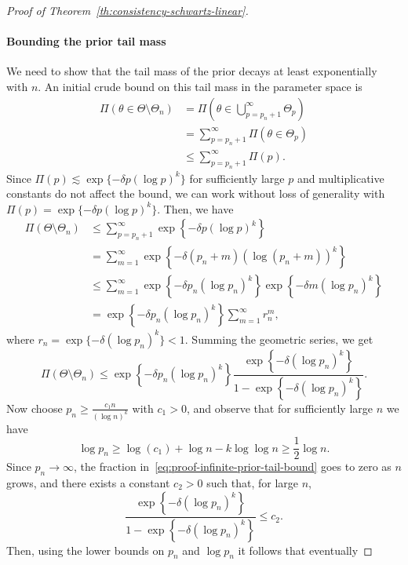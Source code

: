\begin{proof}[Proof of Theorem~\ref{th:consistency-schwartz-linear}]
\paragraph{Bounding the prior tail mass} We need to show that the tail mass of the prior decays at least exponentially with \(n\). An initial crude bound on this tail mass in the parameter space is
\begin{align*}
  \Pi(\theta \in \Theta \setminus \Theta_n) &= \Pi\left(\theta \in \bigcup_{p=p_n + 1}^\infty \Theta_p\right)\\
  &= \sum_{p=p_n+1}^\infty \Pi(\theta \in \Theta_p)\\
  &\leq \sum_{p=p_n+1}^{\infty} \Pi(p).
\end{align*}
Since \(\Pi(p)\lesssim \exp\{-\delta p(\log p)^k\}\) for sufficiently large \(p\) and multiplicative constants do not affect the bound, we can work without loss of generality with \(\Pi(p)=\exp\{-\delta p(\log p)^k\}\). Then, we have
\begin{align*}
  \Pi(\Theta \setminus \Theta_n) & \leq \sum_{p=p_n+1}^\infty \exp\left\{-\delta p(\log p)^k\right\}                                \\
  & = \sum_{m=1}^\infty \exp\left\{-\delta (p_n+m)(\log (p_n+m))^k\right\}                           \\
  & \leq \sum_{m=1}^\infty \exp\left\{-\delta p_n (\log p_n)^k\right\}\exp\left\{-\delta m (\log p_n)^k\right\} \\
  & = \exp\left\{-\delta p_n (\log p_n)^k\right\} \sum_{m=1}^\infty r_n^m,
\end{align*}
where \(r_n=\exp\{-\delta (\log p_n)^k\}<1\). Summing the geometric series, we get
\begin{equation}\label{eq:proof-infinite-prior-tail-bound}
  \Pi(\Theta \setminus \Theta_n) \leq \exp\left\{-\delta p_n (\log p_n)^k\right\} \frac{\exp\left\{-\delta (\log p_n)^k\right\}}{1-\exp\left\{-\delta (\log p_n)^k\right\}}.
\end{equation}
Now choose \(p_n \geq \frac{c_1n}{(\log n)^k}\) with \(c_1>0\), and observe that for sufficiently large \(n\) we have
\[
  \log p_n \geq \log(c_1) + \log n - k\log \log n \geq \frac{1}{2}\log n.
\]
Since \(p_n\to\infty\), the fraction in~\eqref{eq:proof-infinite-prior-tail-bound} goes to zero as \(n\) grows, and there exists a constant \(c_2>0\) such that, for large \(n\),
\[
  \frac{\exp\left\{-\delta (\log p_n)^k\right\}}{1-\exp\left\{-\delta (\log p_n)^k\right\}}\leq c_2.
\]
Then, using the lower bounds on \(p_n\) and \(\log p_n\) it follows that eventually

\end{proof}
